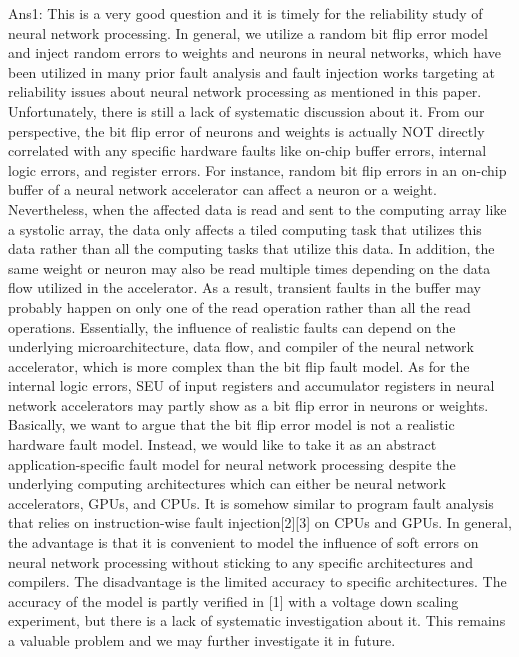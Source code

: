 Ans1: This is a very good question and it is timely for the reliability study of neural network processing. In general, we utilize a random bit flip error model and inject random errors to weights and neurons in neural networks, which have been utilized in many prior fault analysis and fault injection works targeting at reliability issues about neural network processing as mentioned in this paper. Unfortunately, there is still a lack of systematic discussion about it. From our perspective, the bit flip error of neurons and weights is actually NOT directly correlated with any specific hardware faults like on-chip buffer errors, internal logic errors, and register errors. For instance, random bit flip errors in an on-chip buffer of a neural network accelerator can affect a neuron or a weight. Nevertheless, when the affected data is read and sent to the computing array like a systolic array, the data only affects a tiled computing task that utilizes this data rather than all the computing tasks that utilize this data. In addition, the same weight or neuron may also be read multiple times depending on the data flow utilized in the accelerator. As a result, transient faults in the buffer may probably happen on only one of the read operation rather than all the read operations. Essentially, the influence of realistic faults can depend on the underlying microarchitecture, data flow, and compiler of the neural network accelerator, which is more complex than the bit flip fault model. As for the internal logic errors, SEU of input registers and accumulator registers in neural network accelerators may partly show as a bit flip error in neurons or weights. Basically, we want to argue that the bit flip error model is not a realistic hardware fault model. Instead, we would like to take it as an abstract application-specific fault model for neural network processing despite the underlying computing architectures which can either be neural network accelerators, GPUs, and CPUs. It is somehow similar to program fault analysis that relies on instruction-wise fault injection[2][3] on CPUs and GPUs. In general, the advantage is that it is convenient to model the influence of soft errors on neural network processing without sticking to any specific architectures and compilers. The disadvantage is the limited accuracy to specific architectures. The accuracy of the model is partly verified in [1] with a voltage down scaling experiment, but there is a lack of systematic investigation about it. This remains a valuable problem and we may further investigate it in future. 

